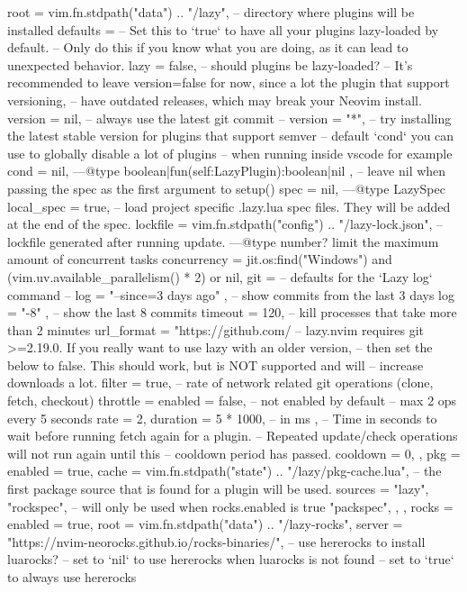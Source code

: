 \begin{listing}
{
root = vim.fn.stdpath("data") .. "/lazy", -- directory where plugins will be installed
defaults = {
-- Set this to `true` to have all your plugins lazy-loaded by default.
-- Only do this if you know what you are doing, as it can lead to unexpected behavior.
lazy = false, -- should plugins be lazy-loaded?
-- It's recommended to leave version=false for now, since a lot the plugin that support versioning,
-- have outdated releases, which may break your Neovim install.
version = nil, -- always use the latest git commit
-- version = "*", -- try installing the latest stable version for plugins that support semver
-- default `cond` you can use to globally disable a lot of plugins
-- when running inside vscode for example
cond = nil, ---@type boolean|fun(self:LazyPlugin):boolean|nil
},
-- leave nil when passing the spec as the first argument to setup()
spec = nil, ---@type LazySpec
local_spec = true, -- load project specific .lazy.lua spec files. They will be added at the end of the spec.
lockfile = vim.fn.stdpath("config") .. "/lazy-lock.json", -- lockfile generated after running update.
---@type number? limit the maximum amount of concurrent tasks
concurrency = jit.os:find("Windows") and (vim.uv.available_parallelism() * 2) or nil,
git = {
-- defaults for the `Lazy log` command
-- log = { "--since=3 days ago" }, -- show commits from the last 3 days
log = { "-8" }, -- show the last 8 commits
timeout = 120, -- kill processes that take more than 2 minutes
url_format = "https://github.com/%
-- lazy.nvim requires git >=2.19.0. If you really want to use lazy with an older version,
-- then set the below to false. This should work, but is NOT supported and will
-- increase downloads a lot.
filter = true,
-- rate of network related git operations (clone, fetch, checkout)
throttle = {
enabled = false, -- not enabled by default
-- max 2 ops every 5 seconds
rate = 2,
duration = 5 * 1000, -- in ms
},
-- Time in seconds to wait before running fetch again for a plugin.
-- Repeated update/check operations will not run again until this
-- cooldown period has passed.
cooldown = 0,
},
pkg = {
enabled = true,
cache = vim.fn.stdpath("state") .. "/lazy/pkg-cache.lua",
-- the first package source that is found for a plugin will be used.
sources = {
"lazy",
"rockspec", -- will only be used when rocks.enabled is true
"packspec",
},
},
rocks = {
enabled = true,
root = vim.fn.stdpath("data") .. "/lazy-rocks",
server = "https://nvim-neorocks.github.io/rocks-binaries/",
-- use hererocks to install luarocks?
-- set to `nil` to use hererocks when luarocks is not found
-- set to `true` to always use hererocks
}}
\end{listing}
